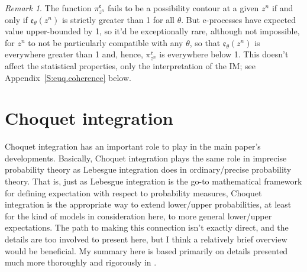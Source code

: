 \documentclass[a4paper, 12pt]{article}
\theoremstyle{plain}
\theoremstyle{definition}
\theoremstyle{remark}
\newtheorem{remark}{Remark}
\newcommand{\uprior}{\overline{\mathsf{Q}}}
\newcommand{\eval}{\mathfrak{e}}
\begin{document}
\begin{remark}
\label{re:typically}
The function $\pi_{z^n}^\eval$ fails to be a possibility contour at a given $z^n$ if and only if $\eval_\theta(z^n)$ is strictly greater than 1 for all $\theta$.  But e-processes have expected value upper-bounded by 1, so it'd be exceptionally rare, although not impossible, for $z^n$ to not be particularly compatible with any $\theta$, so that $\eval_\theta(z^n)$ is everywhere greater than 1 and, hence, $\pi_{z^n}^\eval$ is everywhere below 1. This doesn't affect the statistical properties, only the interpretation of the IM; see Appendix~\ref{S:euq.coherence} below. 
\end{remark}



\section{Choquet integration}
\label{A:choquet}


Choquet integration has an important role to play in the main paper's developments.  Basically, Choquet integration plays the same role in imprecise probability theory as Lebesgue integration does in ordinary/precise probability theory.  That is, just as Lebesgue integration is the go-to mathematical framework for defining expectation with respect to probability measures, Choquet integration is the appropriate way to extend lower/upper probabilities, at least for the kind of models in consideration here, to more general lower/upper expectations.  The path to making this connection isn't exactly direct, and the details are too involved to present here, but I think a relatively brief overview would be beneficial.  My summary here is based primarily on details presented much more thoroughly and rigorously in \citet{lower.previsions.book}.  
\end{document}
